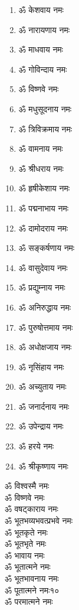 \begin{center}
\begin{multicols}{2}
\begin{enumerate}
\item ॐ केशवाय नमः
\item ॐ नारायणाय नमः
\item ॐ माधवाय नमः
\item ॐ गोविन्दाय नमः
\item ॐ विष्णवे नमः	
\item ॐ मधुसूदनाय नमः
\item ॐ त्रिविक्रमाय नमः
\item ॐ वामनाय नमः
\item ॐ श्रीधराय नमः
\item ॐ हृषीकेशाय नमः
\item ॐ पद्मनाभाय नमः
\item ॐ दामोदराय नमः
\item ॐ सङ्कर्षणाय नमः
\item ॐ वासुदेवाय नमः
\item ॐ प्रद्युम्नाय नमः
\item ॐ अनिरुद्धाय नमः
\item ॐ पुरुषोत्तमाय नमः
\item ॐ अधोक्षजाय नमः
\item ॐ नृसिंहाय नमः
\item ॐ अच्युताय नमः
\item ॐ जनार्दनाय नमः
\item ॐ उपेन्द्राय नमः 
\item ॐ हरये नमः
\item ॐ श्रीकृष्णाय नमः
\end{enumerate}
\end{multicols}
\clearpage
{}
\begin{multicols}{2}\setlength{\columnseprule}{1pt}
\begin{flushleft}
ॐ विश्वस्मै नमः\\
ॐ विष्णवे नमः\\
ॐ वषट्काराय नमः\\
ॐ भूतभव्यभवत्प्रभवे नमः\\
ॐ भूतकृते नमः\\
ॐ भूतभृते नमः\\
ॐ भावाय नमः\\
ॐ भूतात्मने नमः\\
ॐ भूतभावनाय नमः\\
ॐ पूतात्मने नमः\hfill १०\\
ॐ परमात्मने नमः\\

\end{flushleft}
\end{multicols}
\end{center}
